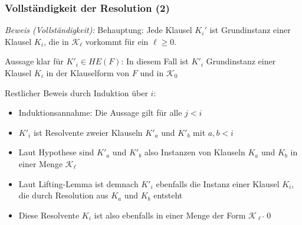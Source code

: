 \documentclass[aspectratio=1610,onlymath]{beamer}
\begin{document}
\begin{frame}[t]\frametitle{Vollständigkeit der Resolution (2)}


\emph{Beweis (Vollständigkeit):} \alert{Behauptung:} Jede Klausel $K_i'$ ist Grundinstanz einer Klausel $K_i$, die in $\mathcal{K}_\ell$ vorkommt für ein $\ell\geq 0$.
\medskip\pause

Aussage klar für $K'_i\in HE(F)$: In diesem Fall ist $K'_i$ Grundinstanz einer Klausel $K_i$ in der Klauselform von $F$ und in $\mathcal{K}_0$\medskip\pause

Restlicher Beweis durch Induktion über $i$:
\begin{itemize}
\item Induktionsannahme: Die Aussage gilt für alle $j<i$\pause
\item $K'_i$ ist Resolvente zweier Klauseln $K'_a$ und $K'_b$ mit $a,b<i$\pause
\item Laut Hypothese sind $K'_a$ und $K'_b$ also Instanzen von Klauseln $K_a$ und $K_b$ in einer Menge $\mathcal{K}_\ell$\pause
\item Laut Lifting-Lemma ist demnach $K'_i$ ebenfalls die Instanz einer Klausel $K_i$, die durch Resolution aus $K_a$ und $K_b$ entsteht\pause
\item Diese Resolvente $K_i$ ist also ebenfalls in einer Menge der Form $\mathcal{K}_{\ell'}$\qed
\end{itemize}

\end{frame}
\end{document}
